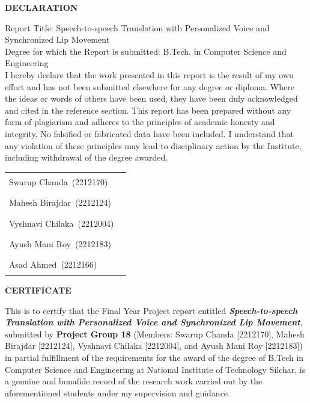\documentclass[12pt,oneside]{report}
\newcommand{\ThesisTitle}{\textbf{Speech-to-speech Translation with Personalized Voice and Synchronized Lip Movement}}
\newcommand{\Programme}{B.Tech in Computer Science and Engineering}
\newcommand{\Institute}{National Institute of Technology Silchar}
\newcommand{\GroupNumber}{18}
\newcommand{\MemberA}{Swarup Chanda}
\newcommand{\RegA}{2212170}
\newcommand{\MemberB}{Mahesh Birajdar}
\newcommand{\RegB}{2212124}
\newcommand{\MemberC}{Vyshnavi Chilaka}
\newcommand{\RegC}{2212004}
\newcommand{\MemberD}{Ayush Mani Roy}
\newcommand{\RegD}{2212183}
\newcommand{\MemberE}{Asad Ahmed}
\newcommand{\RegE}{2212166}
\begin{document}
\thispagestyle{empty}
\begin{center}
  {\LARGE \textbf{DECLARATION}}\\[1.5em]
\end{center}
\noindent
Report Title: Speech-to-speech Translation with Personalized Voice and Synchronized Lip Movement \\
Degree for which the Report is submitted: B.Tech. in Computer Science and Engineering\\[1.2em]
I hereby declare that the work presented in this report is the result of my own effort and has not been submitted elsewhere for any degree or diploma. Where the ideas or words of others have been used, they have been duly acknowledged and cited in the reference section.
This report has been prepared without any form of plagiarism and adheres to the principles of academic honesty and integrity. No falsified or fabricated data have been included. I understand that any violation of these principles may lead to disciplinary action by the Institute, including withdrawal of the degree awarded.\\[2.5em]


\noindent\begin{tabular}{p{8.5cm}p{5cm}}
\MemberA\ (\RegA) & \rule{5cm}{0.4pt} \\[1.5em]
\MemberB\ (\RegB) & \rule{5cm}{0.4pt} \\[1.5em]
\MemberC\ (\RegC) & \rule{5cm}{0.4pt} \\[1.5em]
\MemberD\ (\RegD) & \rule{5cm}{0.4pt} \\[1.5em]
\MemberE\ (\RegE) & \rule{5cm}{0.4pt} \\[1.5em]
\end{tabular}

\newpage

\thispagestyle{empty}
\begin{center}
  {\LARGE \textbf{CERTIFICATE}}\\[1.5em]
\end{center}
\noindent

This is to certify that the Final Year Project report entitled \emph{\ThesisTitle}, submitted by \textbf{Project Group \GroupNumber{}} (Members: \MemberA{} [\RegA], \MemberB{} [\RegB], \MemberC{} [\RegC], and \MemberD{} [\RegD]) in partial fulfillment of the requirements for the award of the degree of \Programme{} at \Institute{}, is a genuine and bonafide record of the research work carried out by the aforementioned students under my supervision and guidance. 
\end{document}

